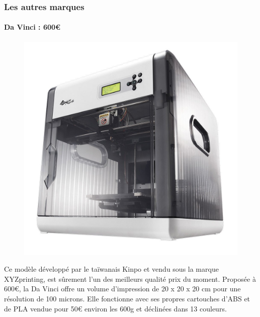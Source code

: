 \documentclass{article}
\begin{document}
\subsubsection{Les autres marques}
\paragraph{Da Vinci : 600\euro{}} \hfill \break
\begin{figure}[h!]
\centering
\includegraphics[scale=0.1]{./images/davinci.png}
\end{figure}\hfill \break
Ce modèle développé par le taïwanais Kinpo et vendu sous la marque XYZprinting, est sûrement l'un des meilleurs qualité prix du moment. Proposée à 600\euro{}, la Da Vinci offre un volume d'impression de 20 x 20 x 20 cm pour une résolution de 100 microns. Elle fonctionne avec ses propres cartouches d'ABS et de PLA vendue pour 50\euro{} environ les 600g et déclinées dans 13 couleurs.
\end{document}
